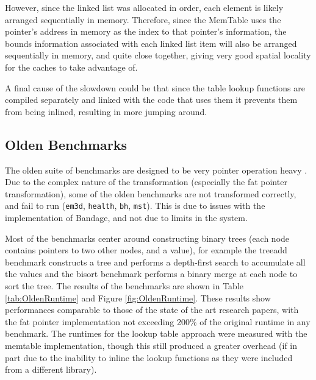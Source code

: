 However, since the linked list was allocated in order, each element is likely arranged sequentially in memory.
Therefore, since the MemTable uses the pointer's address in memory as the index to that pointer's information, the bounds information associated with each linked list item will also be arranged sequentially in memory, and quite close together, giving very good spatial locality for the caches to take advantage of.

A final cause of the slowdown could be that since the table lookup functions are compiled separately and linked with the code that uses them it prevents them from being inlined, resulting in more jumping around.

\subsection{Olden Benchmarks}

The olden suite of benchmarks are designed to be very pointer operation heavy \cite{olden}.
Due to the complex nature of the transformation (especially the fat pointer transformation), some of the olden benchmarks are not transformed correctly, and fail to run (\verb!em3d!, \verb!health!, \verb!bh!, \verb!mst!).
This is due to issues with the implementation of Bandage, and not due to limits in the system.

Most of the benchmarks center around constructing binary trees (each node contains pointers to two other nodes, and a value), for example the treeadd benchmark constructs a tree and performs a depth-first search to accumulate all the values and the bisort benchmark performs a binary merge at each node to sort the tree.
The results of the benchmarks are shown in Table \ref{tab:OldenRuntime} and Figure \ref{fig:OldenRuntime}.
These results show performances comparable to those of the state of the art research papers, with the fat pointer implementation not exceeding 200\% of the original runtime in any benchmark.
The runtimes for the lookup table approach were measured with the memtable implementation, though this still produced a greater overhead (if in part due to the inability to inline the lookup functions as they were included from a different library).

